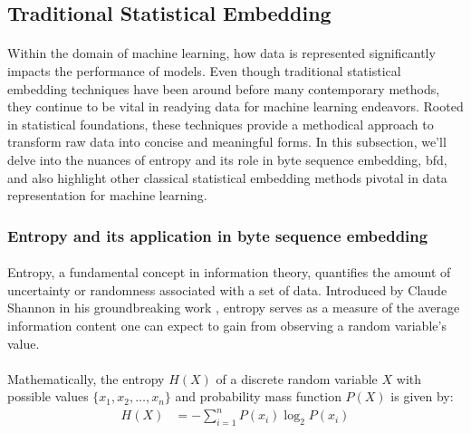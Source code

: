 \subsection{Traditional Statistical Embedding}

    \paragraph{}Within the domain of machine learning, how data is represented significantly impacts the performance of models. Even though traditional statistical embedding techniques have been around before many contemporary methods, they continue to be vital in readying data for machine learning endeavors. Rooted in statistical foundations, these techniques provide a methodical approach to transform raw data into concise and meaningful forms. In this subsection, we'll delve into the nuances of entropy and its role in byte sequence embedding, \acrfull{bfd}, and also highlight other classical statistical embedding methods pivotal in data representation for machine learning.
        
    \subsubsection{Entropy and its application in byte sequence embedding}
        \paragraph{}Entropy, a fundamental concept in information theory, quantifies the amount of uncertainty or randomness associated with a set of data. Introduced by Claude Shannon in his groundbreaking work \cite{shannon_mathematical_1948}, entropy serves as a measure of the average information content one can expect to gain from observing a random variable's value.

        \paragraph{}Mathematically, the entropy \(H(X)\) of a discrete random variable \(X\) with possible values \newline \(\{x_1, x_2, \ldots, x_n\}\) and probability mass function \(P(X)\) is given by:
        \begin{align}
            H(X) &= -\sum_{i=1}^{n} P(x_i) \log_2 P(x_i)
            \label{eq:shannon_entropy}
        \end{align}

